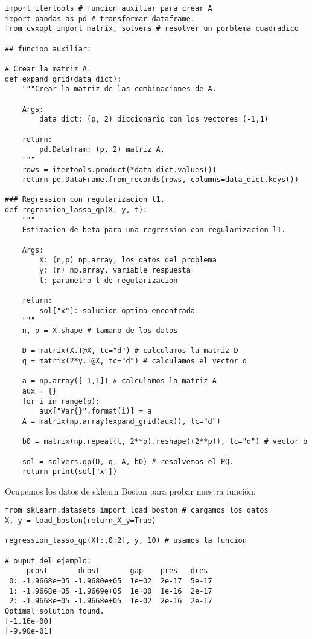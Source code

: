 \documentclass[11pt,letterpaper]{article}
\begin{document}
\begin{enumerate}
\begin{lstlisting}
import itertools # funcion auxiliar para crear A
import pandas as pd # transformar dataframe.
from cvxopt import matrix, solvers # resolver un porblema cuadradico

## funcion auxiliar:

# Crear la matriz A.
def expand_grid(data_dict):
    """Crear la matriz de las combinaciones de A.
    
    Args:
        data_dict: (p, 2) diccionario con los vectores (-1,1)
    
    return:
        pd.Datafram: (p, 2) matriz A.
    """
    rows = itertools.product(*data_dict.values())
    return pd.DataFrame.from_records(rows, columns=data_dict.keys())
    
### Regression con regularizacion l1.
def regression_lasso_qp(X, y, t):
    """
    Estimacion de beta para una regression con regularizacion l1.
    
    Args:
        X: (n,p) np.array, los datos del problema
        y: (n) np.array, variable respuesta
        t: parametro t de regularizacion
        
    return:
        sol["x"]: solucion optima encontrada
    """
    n, p = X.shape # tamano de los datos
    
    D = matrix(X.T@X, tc="d") # calculamos la matriz D
    q = matrix(2*y.T@X, tc="d") # calculamos el vector q
    
    a = np.array([-1,1]) # calculamos la matriz A
    aux = {}
    for i in range(p):
        aux["Var{}".format(i)] = a
    A = matrix(np.array(expand_grid(aux)), tc="d")
    
    b0 = matrix(np.repeat(t, 2**p).reshape((2**p)), tc="d") # vector b
    
    sol = solvers.qp(D, q, A, b0) # resolvemos el PQ.
    return print(sol["x"])
\end{lstlisting}  

Ocupemos los datos de sklearn Boston para probar nuestra función:

\begin{lstlisting}
from sklearn.datasets import load_boston # cargamos los datos
X, y = load_boston(return_X_y=True)

regression_lasso_qp(X[:,0:2], y, 10) # usamos la funcion

# ouput del ejemplo:
     pcost       dcost       gap    pres   dres
 0: -1.9668e+05 -1.9680e+05  1e+02  2e-17  5e-17
 1: -1.9668e+05 -1.9669e+05  1e+00  1e-16  2e-17
 2: -1.9668e+05 -1.9668e+05  1e-02  2e-16  2e-17
Optimal solution found.
[-1.16e+00]
[-9.90e-01]
\end{lstlisting}
\end{enumerate}
\end{document}
